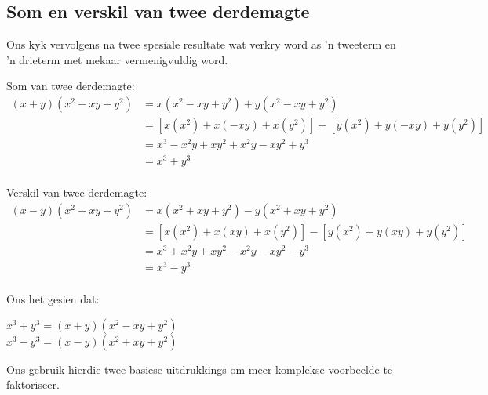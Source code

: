 


\subsection*{Som en verskil van twee derdemagte}      
Ons kyk vervolgens na twee spesiale resultate wat verkry word as 'n tweeterm en 'n drieterm met mekaar vermenigvuldig word.\par

Som van twee derdemagte:
\begin{align*}
  (x+y)({x}^{2}-xy+{y}^{2}) &= x({x}^{2}-xy+{y}^{2})+y({x}^{2}- xy+{y}^{2})\\
  &= \left[x({x}^{2})+x(-xy)+x({y}^{2})\right]+\left[y({x}^{2})+y(-xy)+y({y}^{2})\right]\\
  &= {x}^{3}-{x}^{2}y+x{y}^{2}+{x}^{2}y-x{y}^{2}+{y}^{3} \\
  &= {x}^{3}+{y}^{3}\\
\end{align*}

\par
Verskil van twee derdemagte:
\begin{align*}
(x-y)({x}^{2}+xy+{y}^{2}) &= x({x}^{2}+xy+{y}^{2})-y({x}^{2}+ xy+{y}^{2})\\
  &= \left[x({x}^{2})+x(xy)+x({y}^{2})\right]-\left[y({x}^{2})+y(xy)+y({y}^{2})\right]\\
  &= {x}^{3}+{x}^{2}y+x{y}^{2}-{x}^{2}y-x{y}^{2}-{y}^{3} \\
  &= {x}^{3}-{y}^{3}\\
\end{align*}

Ons het gesien dat:
\begin{center}
${x}^{3}+{y}^{3}=(x+y)({x}^{2}-xy+{y}^{2})$\\
${x}^{3}-{y}^{3}=(x-y)({x}^{2}+xy+{y}^{2})$\\
\end{center}
\par
Ons gebruik hierdie twee basiese uitdrukkings om meer komplekse voorbeelde te faktoriseer.


